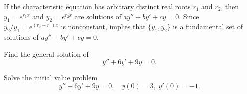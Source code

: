 If the characteristic equation has arbitrary distinct real roots
$r_1$ and $r_2$, then
$y_1=e^{r_1x}$ and $y_2=e^{r_2x}$  are  solutions of $ay''+by'+cy=0$.
Since $y_2/y_1=e^{(r_2-r_1)x}$ is nonconstant, 
 implies that  $\{y_1,y_2\}$ is a fundamental
set of solutions of $ay''+by'+cy=0$.



\begin{example}\label{example:5.2.2}
\begin{alist}
\item %
Find the general solution of
\begin{equation} \label{eq:5.2.8}
y''+6y'+9y=0.
\end{equation}

\item %
Solve the initial value problem
\begin{equation} \label{eq:5.2.9}
y''+6y'+9y=0, \quad   y(0)=3,\;  y'(0)=-1.
\end{equation}
\end{alist}
\end{example}

